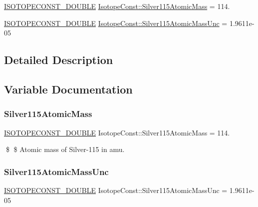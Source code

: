 \begin{DoxyCompactItemize}
\item 
\mbox{\hyperlink{group___isotope_const-_macros_ga8f45a7272ce02c0b4c65c44636ed719a}{I\+S\+O\+T\+O\+P\+E\+C\+O\+N\+S\+T\+\_\+\+D\+O\+U\+B\+LE}} \mbox{\hyperlink{group___isotope_const-_silver-_ag115_ga7a7d7b594fb78c7338a0178ab90ddfb7}{Isotope\+Const\+::\+Silver115\+Atomic\+Mass}} = 114.
\item 
\mbox{\hyperlink{group___isotope_const-_macros_ga8f45a7272ce02c0b4c65c44636ed719a}{I\+S\+O\+T\+O\+P\+E\+C\+O\+N\+S\+T\+\_\+\+D\+O\+U\+B\+LE}} \mbox{\hyperlink{group___isotope_const-_silver-_ag115_gad58e0fe8fab36bdf3289e59c33fbcd63}{Isotope\+Const\+::\+Silver115\+Atomic\+Mass\+Unc}} = 1.\+9611e-\/05
\end{DoxyCompactItemize}


\subsection{Detailed Description}


\subsection{Variable Documentation}
\mbox{\label{group___isotope_const-_silver-_ag115_ga7a7d7b594fb78c7338a0178ab90ddfb7}} 
\subsubsection{\texorpdfstring{Silver115\+Atomic\+Mass}{Silver115AtomicMass}}
{\footnotesize\ttfamily \mbox{\hyperlink{group___isotope_const-_macros_ga8f45a7272ce02c0b4c65c44636ed719a}{I\+S\+O\+T\+O\+P\+E\+C\+O\+N\+S\+T\+\_\+\+D\+O\+U\+B\+LE}} Isotope\+Const\+::\+Silver115\+Atomic\+Mass = 114.}

\$ \$ Atomic mass of Silver-\/115 in amu. \mbox{\label{group___isotope_const-_silver-_ag115_gad58e0fe8fab36bdf3289e59c33fbcd63}} 
\subsubsection{\texorpdfstring{Silver115\+Atomic\+Mass\+Unc}{Silver115AtomicMassUnc}}
{\footnotesize\ttfamily \mbox{\hyperlink{group___isotope_const-_macros_ga8f45a7272ce02c0b4c65c44636ed719a}{I\+S\+O\+T\+O\+P\+E\+C\+O\+N\+S\+T\+\_\+\+D\+O\+U\+B\+LE}} Isotope\+Const\+::\+Silver115\+Atomic\+Mass\+Unc = 1.\+9611e-\/05}

